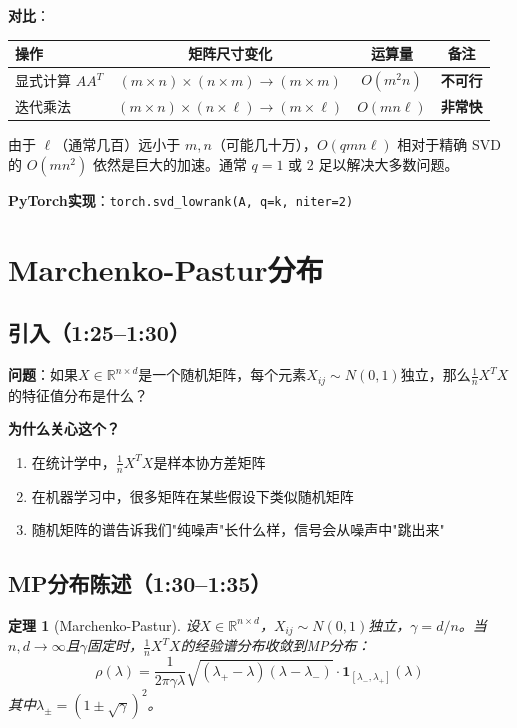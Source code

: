 \documentclass[11pt,a4paper]{ctexart}
\newtheorem{theorem}{定理}[section]
\theoremstyle{definition}
\theoremstyle{remark}
\begin{document}
\textbf{对比}：
\begin{center}
\begin{tabular}{lccc}
\toprule
操作 & 矩阵尺寸变化 & 运算量 & 备注 \\
\midrule
显式计算 $AA^T$ & $(m \times n) \times (n \times m) \to (m \times m)$ & $O(m^2 n)$ & \textbf{不可行} \\
迭代乘法 & $(m \times n) \times (n \times \ell) \to (m \times \ell)$ & $O(mn\ell)$ & \textbf{非常快} \\
\bottomrule
\end{tabular}
\end{center}
由于 $\ell$（通常几百）远小于 $m, n$（可能几十万），$O(qmn\ell)$ 相对于精确 SVD 的 $O(mn^2)$ 依然是巨大的加速。通常 $q=1$ 或 $2$ 足以解决大多数问题。

\textbf{PyTorch实现}：\texttt{torch.svd\_lowrank(A, q=k, niter=2)}

\section{Marchenko-Pastur分布}

\subsection{引入（1:25--1:30）}

\textbf{问题}：如果$X \in \mathbb{R}^{n \times d}$是一个随机矩阵，每个元素$X_{ij} \sim N(0, 1)$独立，那么$\frac{1}{n}X^TX$的特征值分布是什么？

\textbf{为什么关心这个？}
\begin{enumerate}
    \item 在统计学中，$\frac{1}{n}X^TX$是样本协方差矩阵
    \item 在机器学习中，很多矩阵在某些假设下类似随机矩阵
    \item 随机矩阵的谱告诉我们"纯噪声"长什么样，信号会从噪声中"跳出来"
\end{enumerate}

\subsection{MP分布陈述（1:30--1:35）}

\begin{theorem}[Marchenko-Pastur]
设$X \in \mathbb{R}^{n \times d}$，$X_{ij} \sim N(0, 1)$独立，$\gamma = d/n$。当$n, d \to \infty$且$\gamma$固定时，$\frac{1}{n}X^TX$的经验谱分布收敛到MP分布：
\[
\rho(\lambda) = \frac{1}{2\pi\gamma\lambda}\sqrt{(\lambda_+ - \lambda)(\lambda - \lambda_-)} \cdot \mathbf{1}_{[\lambda_-, \lambda_+]}(\lambda)
\]
其中$\lambda_{\pm} = (1 \pm \sqrt{\gamma})^2$。
\end{theorem}
\end{document}
